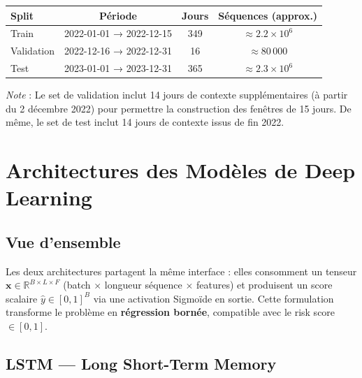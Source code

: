 \documentclass[12pt,a4paper]{report}
\begin{document}
\vspace{0.5cm}

\begin{center}
\begin{tabular}{lccc}
\toprule
\rowcolor{fireOrange!15}
\textbf{Split} & \textbf{Période} & \textbf{Jours} & \textbf{Séquences (approx.)} \\
\midrule
\textcolor{lstmBlue}{Train}       & 2022-01-01 → 2022-12-15 & 349  & $\approx 2.2 \times 10^6$ \\
\textcolor{riskYellow!80!black}{Validation} & 2022-12-16 → 2022-12-31 & 16 & $\approx 80\,000$ \\
\textcolor{tcnRed}{Test}          & 2023-01-01 → 2023-12-31 & 365  & $\approx 2.3 \times 10^6$ \\
\bottomrule
\end{tabular}
\end{center}

\textit{Note} : Le set de validation inclut 14 jours de contexte supplémentaires
(à partir du 2 décembre 2022) pour permettre la construction des fenêtres de 15 jours.
De même, le set de test inclut 14 jours de contexte issus de fin 2022.

\clearpage

\chapter{Architectures des Modèles de Deep Learning}
\label{chap:models}

\section{Vue d'ensemble}

Les deux architectures partagent la même interface : elles consomment un tenseur
$\mathbf{x} \in \mathbb{R}^{B \times L \times F}$ (batch $\times$ longueur séquence
$\times$ features) et produisent un score scalaire $\hat{y} \in [0, 1]^B$ via une
activation Sigmoïde en sortie. Cette formulation transforme le problème en
\textbf{régression bornée}, compatible avec le risk score $\in [0,1]$.

\section{LSTM — Long Short-Term Memory}
\label{sec:lstm}
\end{document}
